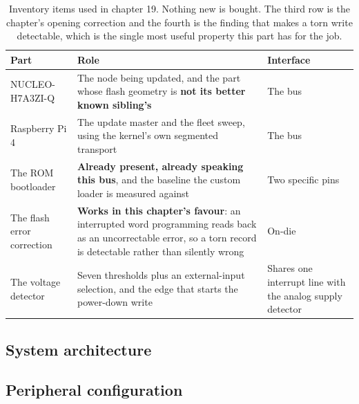 \begin{table}[H]\centering\small
\begin{tabular}{p{40mm}p{66mm}p{40mm}}
\toprule
Part & Role & Interface \\
\midrule
NUCLEO-H7A3ZI-Q & The node being updated, and the part whose flash geometry is
\textbf{not its better known sibling's} & The bus \\
Raspberry Pi 4 & The update master and the fleet sweep, using the kernel's own
segmented transport & The bus \\
The ROM bootloader & \textbf{Already present, already speaking this bus}, and the
baseline the custom loader is measured against & Two specific pins \\
The flash error correction & \textbf{Works in this chapter's favour}: an
interrupted word programming reads back as an uncorrectable error, so a torn
record is detectable rather than silently wrong & On-die \\
The voltage detector & Seven thresholds plus an external-input selection, and the
edge that starts the power-down write & Shares one interrupt line with the
analog supply detector \\
\bottomrule
\end{tabular}
\caption{Inventory items used in chapter 19. Nothing new is bought. The third row is the chapter's opening correction and the fourth is the finding that makes a torn write detectable, which is the single most useful property this part has for the job.}
\end{table}

\subsection*{System architecture}


\subsection*{Peripheral configuration}

